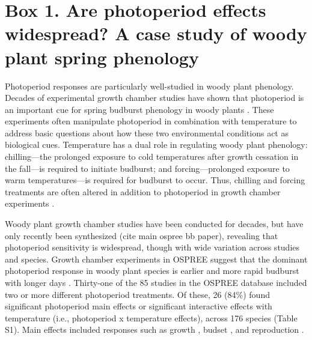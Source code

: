 \documentclass{article}
\begin{document}
\section*{Box 1. Are photoperiod effects widespread? A case study of woody plant spring phenology}
Photoperiod responses are particularly well-studied in woody plant phenology. Decades of experimental growth chamber studies have shown that photoperiod is an important cue for spring budburst phenology in woody plants \citep[e.g.,][]{Heide:1993a,Basler:2014aa,flynn2018}. These experiments often manipulate photoperiod in combination with temperature to address basic questions about how these two environmental conditions act as biological cues. Temperature has a dual role in regulating woody plant phenology: chilling---the prolonged exposure to cold temperatures after growth cessation in the fall---is required to initiate budburst; and forcing---prolonged exposure to warm temperatures---is required for budburst to occur. Thus, chilling and forcing treatments are often altered in addition to photoperiod in growth chamber experiments \citep[e.g.,][]{Campbell:1975aa,HEIDE:1977aa,Falusi:1990aa,Spann:2004aa,Laube:2014a}. %
\par Woody plant growth chamber studies have been conducted for decades, but have only recently been synthesized (cite main ospree bb paper), revealing that photoperiod sensitivity is widespread, though with wide variation across studies and species. Growth chamber experiments in OSPREE suggest that the dominant photoperiod response in woody plant species is earlier and more rapid budburst with longer days \citep [e.g., ][]{Caffarra:2011a}. Thirty-one of the 85 studies in the OSPREE database included two or more different photoperiod treatments. Of these, 26 (84\%) found significant photoperiod main effects or significant interactive effects with temperature (i.e., photoperiod x temperature effects), across 176 species (Table S1). Main effects included responses such as growth \citep[e.g., higher growth rates with longer days][]{Ashby:1962aa}, budset \citep[e.g., more rapid induction of budset with shorter days][]{Howe:1995aa}, and reproduction \citep[e.g., increased flowering with longer days][]{Heide:2012aa}. 
\end{document}
